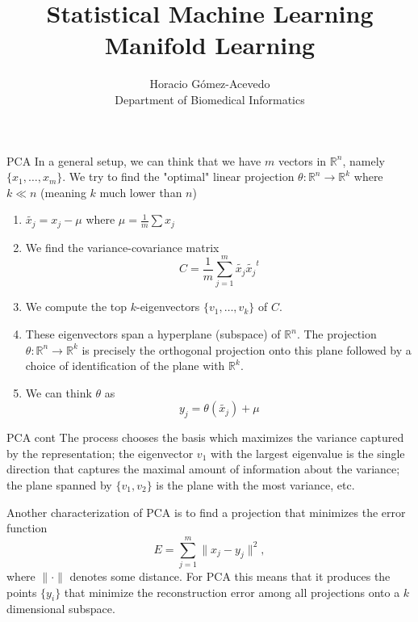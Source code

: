 \documentclass{beamer}
\title{Statistical Machine Learning\\ Manifold Learning}
\author{Horacio G\'omez-Acevedo\\ Department of Biomedical Informatics}
\begin{document}
	\begin{frame}[plain]
		\maketitle
	\end{frame}
	

\begin{frame}{PCA}
	In a general setup, we can think that we have $m$ vectors in $\mathbb{R}^n$, namely $\{x_1, \ldots, x_m\}$. We try to find the "optimal" linear projection $\theta \colon \mathbb{R}^n \to \mathbb{R}^k$ where $k \ll n$ (meaning $k$ much lower than $n$)
	\begin{enumerate}
		\item $\tilde{x_j} = x_j -\mu$ where $\mu= \frac{1}{m} \sum x_j$
		\item We find the variance-covariance matrix 
		\begin{equation*}
			C=\frac{1}{m} \sum_{j=1}^m \tilde{x_j} \tilde{x_j}^t
		\end{equation*}
		\item We compute the top $k$-eigenvectors $\{v_1, \ldots, v_k\}$ of $C$.
		\item These eigenvectors span a hyperplane (subspace) of $\mathbb{R}^n$. The projection $\theta \colon \mathbb{R}^n \to \mathbb{R}^k$ is precisely the orthogonal projection onto this plane followed by a choice of identification of the plane with $\mathbb{R}^k$.
		\item We can think $\theta$ as 
		\begin{equation*}
			y_j= \theta(\tilde{x_j})+ \mu
		\end{equation*}
		
	\end{enumerate}
	
	
\end{frame}

\begin{frame}{PCA cont}
	The process chooses the basis which maximizes the variance captured by the representation; the eigenvector $v_1$ with the largest eigenvalue is the single direction that captures the maximal amount of information about the variance; the plane spanned by $\{v_1,v_2\}$ is the plane with the most variance, etc.
	
	Another characterization of PCA is to find a projection that minimizes the error function
	\begin{equation*}
		E= \sum_{j=1}^m \| x_j -y_j \|^2, 
	\end{equation*}
	where $\| \cdot \|$ denotes some distance. For PCA this means that it produces the points $\{y_i\}$ that minimize the reconstruction error among all projections onto a $k$ dimensional subspace. 
\end{frame}
\end{document}
